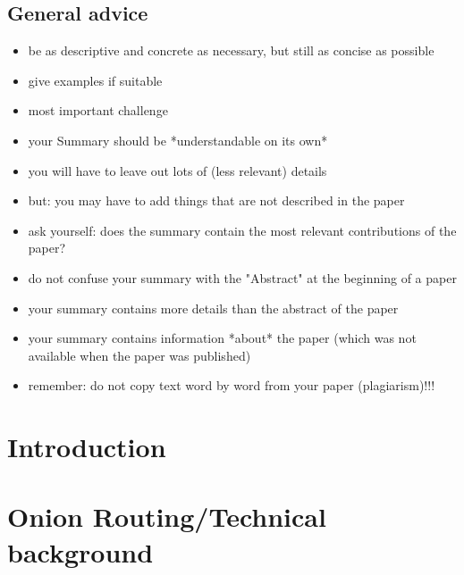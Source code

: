 \documentclass[11pt,twocolumn,a4paper,DIV=calc]{scrartcl}
\begin{document}
\subsection{General advice}
\begin{itemize}
 \item be as descriptive and concrete as necessary, but still as concise as possible
 \item give examples if suitable

 \item most important challenge
   \item your Summary should be *understandable on its own*
     \item you will have to leave out lots of (less relevant) details
     \item but: you may have to add things that are not described in the paper

  \item ask yourself: does the summary contain the most relevant contributions of the paper?

 \item do not confuse your summary with the "Abstract" at the beginning of a paper
   \item your summary contains more details than the abstract of the paper
   \item your summary contains information *about* the paper (which was not available when the paper was published)

  \item remember: do not copy text word by word from your paper (plagiarism)!!!

\end{itemize}

\newpage

\section{Introduction}




\section{Onion Routing/Technical background}

\end{document}
